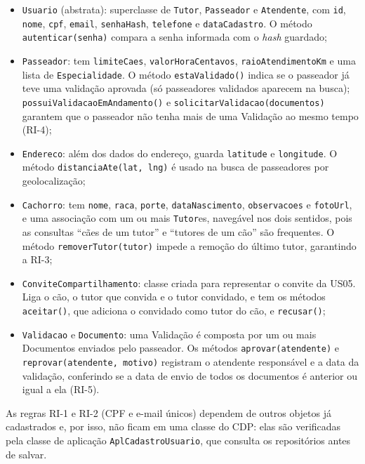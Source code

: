 \begin{itemize}
	\item \texttt{Usuario} (abstrata): superclasse de \texttt{Tutor}, \texttt{Passeador} e \texttt{Atendente}, com \texttt{id}, \texttt{nome}, \texttt{cpf}, \texttt{email}, \texttt{senhaHash}, \texttt{telefone} e \texttt{dataCadastro}. O método \texttt{autenticar(senha)} compara a senha informada com o \textit{hash} guardado;

	\item \texttt{Passeador}: tem \texttt{limiteCaes}, \texttt{valorHoraCentavos}, \texttt{raioAtendimentoKm} e uma lista de \texttt{Especialidade}. O método \texttt{estaValidado()} indica se o passeador já teve uma validação aprovada (só passeadores validados aparecem na busca); \texttt{possuiValidacaoEmAndamento()} e \texttt{solicitarValidacao(documentos)} garantem que o passeador não tenha mais de uma Validação ao mesmo tempo (RI-4);

	\item \texttt{Endereco}: além dos dados do endereço, guarda \texttt{latitude} e \texttt{longitude}. O método \texttt{distanciaAte(lat, lng)} é usado na busca de passeadores por geolocalização;

	\item \texttt{Cachorro}: tem \texttt{nome}, \texttt{raca}, \texttt{porte}, \texttt{dataNascimento}, \texttt{observacoes} e \texttt{fotoUrl}, e uma associação com um ou mais \texttt{Tutor}es, navegável nos dois sentidos, pois as consultas ``cães de um tutor'' e ``tutores de um cão'' são frequentes. O método \texttt{removerTutor(tutor)} impede a remoção do último tutor, garantindo a RI-3;

	\item \texttt{ConviteCompartilhamento}: classe criada para representar o convite da US05. Liga o cão, o tutor que convida e o tutor convidado, e tem os métodos \texttt{aceitar()}, que adiciona o convidado como tutor do cão, e \texttt{recusar()};

	\item \texttt{Validacao} e \texttt{Documento}: uma Validação é composta por um ou mais Documentos enviados pelo passeador. Os métodos \texttt{aprovar(atendente)} e \texttt{reprovar(atendente, motivo)} registram o atendente responsável e a data da validação, conferindo se a data de envio de todos os documentos é anterior ou igual a ela (RI-5).
\end{itemize}

As regras RI-1 e RI-2 (CPF e e-mail únicos) dependem de outros objetos já cadastrados e, por isso, não ficam em uma classe do CDP: elas são verificadas pela classe de aplicação \texttt{AplCadastroUsuario}, que consulta os repositórios antes de salvar.


